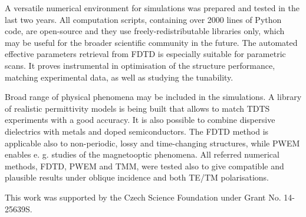 A versatile numerical environment for simulations was prepared and tested in the last two years. All computation scripts, containing over 2000 lines of Python code, are open-source and they use freely-redistributable libraries only, which may be useful for the broader scientific community in the future. 
The automated effective parameters retrieval from FDTD is especially suitable for parametric scans. It proves instrumental in optimisation of the structure performance, matching experimental data, as well as studying the tunability.

Broad range of physical phenomena may be included in the simulations. A library of realistic permittivity models is being built that allows to match TDTS experiments with a good accuracy. It is also possible to combine dispersive dielectrics with metals and doped semiconductors. 
 The FDTD method is applicable also to non-periodic, lossy and time-changing structures, while PWEM enables e. g. studies of the magnetooptic phenomena.
All referred numerical methods, FDTD, PWEM and TMM, were tested also to give compatible and plausible results under oblique incidence and both TE/TM polarisations. 


This work was supported by the Czech Science Foundation under Grant No. 14-25639S.

